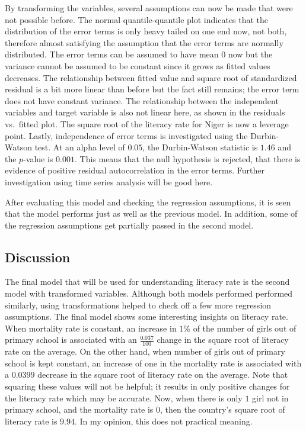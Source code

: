 \documentclass[]{article}
\begin{document}
By transforming the variables, several assumptions can now be made that
were not possible before. The normal quantile-quantile plot indicates
that the distribution of the error terms is only heavy tailed on one end
now, not both, therefore almost satisfying the assumption that the error
terms are normally distributed. The error terms can be assumed to have
mean \(0\) now but the variance cannot be assumed to be constant since
it grows as fitted values decreases. The relationship between fitted
value and square root of standardized residual is a bit more linear than
before but the fact still remains; the error term does not have constant
variance. The relationship between the independent variables and target
variable is also not linear here, as shown in the residuals vs.~fitted
plot. The square root of the literacy rate for Niger is now a leverage
point. Lastly, independence of error terms is investigated using the
Durbin-Watson test. At an alpha level of \(0.05\), the Durbin-Watson
statistic is \(1.46\) and the \(p\)-value is \(0.001\). This means that
the null hypothesis is rejected, that there is evidence of positive
residual autocorrelation in the error terms. Further investigation using
time series analysis will be good here.

After evaluating this model and checking the regression assumptions, it
is seen that the model performs just as well as the previous model. In
addition, some of the regression assumptions get partially passed in the
second model.

\hypertarget{discussion}{%
\subsection{Discussion}\label{discussion}}

The final model that will be used for understanding literacy rate is the
second model with transformed variables. Although both models performed
performed similarly, using transformations helped to check off a few
more regression assumptions. The final model shows some interesting
insights on literacy rate. When mortality rate is constant, an increase
in \(1\%\) of the number of girls out of primary school is associated
with an \(\frac{0.037}{100}\) change in the square root of literacy rate
on the average. On the other hand, when number of girls out of primary
school is kept constant, an increase of one in the mortality rate is
associated with a \(0.0399\) decrease in the square root of literacy
rate on the average. Note that squaring these values will not be
helpful; it results in only positive changes for the literacy rate which
may be accurate. Now, when there is only \(1\) girl not in primary
school, and the mortality rate is \(0\), then the country's square root
of literacy rate is \(9.94\). In my opinion, this does not practical
meaning.
\end{document}
